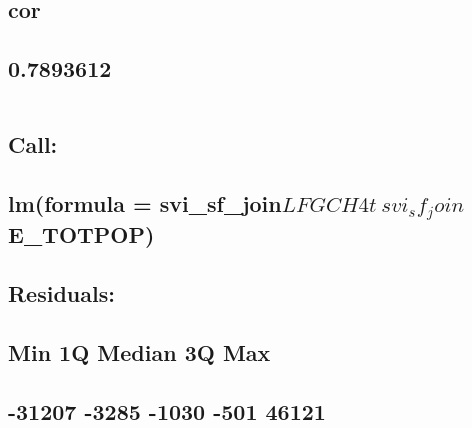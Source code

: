 \documentclass[
  12pt,
]{article}
\begin{document}
\hypertarget{cor-4}{%
\subsection{cor}\label{cor-4}}

\hypertarget{section-43}{%
\subsection{0.7893612}\label{section-43}}

\begin{verbatim}
\end{verbatim}

\hypertarget{section-44}{%
\subsection{}\label{section-44}}

\hypertarget{call-4}{%
\subsection{Call:}\label{call-4}}

\hypertarget{lmformula-svi_sf_joinlfgch4t-svi_sf_joine_totpop}{%
\subsection{\texorpdfstring{lm(formula =
svi\_sf\_join\(LFGCH4t ~ svi_sf_join\)E\_TOTPOP)}{lm(formula = svi\_sf\_joinLFGCH4t \textasciitilde{} svi\_sf\_joinE\_TOTPOP)}}\label{lmformula-svi_sf_joinlfgch4t-svi_sf_joine_totpop}}

\hypertarget{section-45}{%
\subsection{}\label{section-45}}

\hypertarget{residuals-4}{%
\subsection{Residuals:}\label{residuals-4}}

\hypertarget{min-1q-median-3q-max-4}{%
\subsection{Min 1Q Median 3Q Max}\label{min-1q-median-3q-max-4}}

\hypertarget{section-46}{%
\subsection{-31207 -3285 -1030 -501 46121}\label{section-46}}
\end{document}
